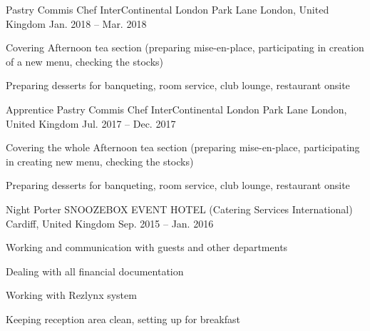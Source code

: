 \begin{cventries}
  \cventry
    {Pastry Commis Chef} %
    {InterContinental London Park Lane} %
    {London, United Kingdom} %
    {Jan. 2018 -- Mar. 2018} %
    {
      \begin{cvitems} %
        \item {Covering Afternoon tea section (preparing mise-en-place, participating in creation of a new menu, checking the stocks)}
        \item {Preparing desserts for banqueting, room service, club lounge, restaurant onsite}
      \end{cvitems}
    }

  \cventry
    {Apprentice Pastry Commis Chef} %
    {InterContinental London Park Lane} %
    {London, United Kingdom} %
    {Jul. 2017 -- Dec. 2017} %
    {
      \begin{cvitems} %
        \item {Covering the whole Afternoon tea section (preparing mise-en-place, participating in creating new menu, checking the stocks)}
        \item {Preparing desserts for banqueting, room service, club lounge, restaurant onsite}
      \end{cvitems}
    }

  \cventry
    {Night Porter} %
    {SNOOZEBOX EVENT HOTEL (Catering Services International)} %
    {Cardiff, United Kingdom} %
    {Sep. 2015 -- Jan. 2016} %
    {
      \begin{cvitems} %
        \item {Working and communication with guests and other departments}
        \item {Dealing with all financial documentation}
        \item {Working with Rezlynx system}
        \item {Keeping reception area clean, setting up for breakfast}
      \end{cvitems}
    }


\end{cventries}
